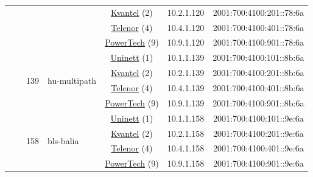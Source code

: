 \begin{small}
\begin{center}
\begin{longtable}{|c|c|c|c|c|c|c|c|}
  &  &  &  & \multicolumn{2}{|c|}{\tiny{\href{http://kvantel.no}{Kvantel} (2)}} & \tiny{10.2.1.120} & \tiny{2001:700:4100:201::78:6a} \\* \cline{5-5}\cline{6-6}\cline{7-7}\cline{8-8}
  &  &  &  & \multicolumn{2}{|c|}{\tiny{\href{https://www.telenor.no}{Telenor} (4)}} & \tiny{10.4.1.120} & \tiny{2001:700:4100:401::78:6a} \\* \cline{5-5}\cline{6-6}\cline{7-7}\cline{8-8}
  &  &  &  & \multicolumn{2}{|c|}{\tiny{\href{http://www.powertech.no}{PowerTech} (9)}} & \tiny{10.9.1.120} & \tiny{2001:700:4100:901::78:6a} \\* \cline{3-3}\cline{4-4}\cline{5-5}\cline{6-6}\cline{7-7}\cline{8-8}
  &  & \multirow{4}{*}{\tiny{139}} & \multicolumn{1}{|l|}{\multirow{4}{*}{\tiny{hu-multipath}}} & \multicolumn{2}{|c|}{\tiny{\href{https://www.uninett.no}{Uninett} (1)}} & \tiny{10.1.1.139} & \tiny{2001:700:4100:101::8b:6a} \\* \cline{5-5}\cline{6-6}\cline{7-7}\cline{8-8}
  &  &  &  & \multicolumn{2}{|c|}{\tiny{\href{http://kvantel.no}{Kvantel} (2)}} & \tiny{10.2.1.139} & \tiny{2001:700:4100:201::8b:6a} \\* \cline{5-5}\cline{6-6}\cline{7-7}\cline{8-8}
  &  &  &  & \multicolumn{2}{|c|}{\tiny{\href{https://www.telenor.no}{Telenor} (4)}} & \tiny{10.4.1.139} & \tiny{2001:700:4100:401::8b:6a} \\* \cline{5-5}\cline{6-6}\cline{7-7}\cline{8-8}
  &  &  &  & \multicolumn{2}{|c|}{\tiny{\href{http://www.powertech.no}{PowerTech} (9)}} & \tiny{10.9.1.139} & \tiny{2001:700:4100:901::8b:6a} \\* \cline{3-3}\cline{4-4}\cline{5-5}\cline{6-6}\cline{7-7}\cline{8-8}
  &  & \multirow{4}{*}{\tiny{158}} & \multicolumn{1}{|l|}{\multirow{4}{*}{\tiny{bls-balia}}} & \multicolumn{2}{|c|}{\tiny{\href{https://www.uninett.no}{Uninett} (1)}} & \tiny{10.1.1.158} & \tiny{2001:700:4100:101::9e:6a} \\* \cline{5-5}\cline{6-6}\cline{7-7}\cline{8-8}
  &  &  &  & \multicolumn{2}{|c|}{\tiny{\href{http://kvantel.no}{Kvantel} (2)}} & \tiny{10.2.1.158} & \tiny{2001:700:4100:201::9e:6a} \\* \cline{5-5}\cline{6-6}\cline{7-7}\cline{8-8}
  &  &  &  & \multicolumn{2}{|c|}{\tiny{\href{https://www.telenor.no}{Telenor} (4)}} & \tiny{10.4.1.158} & \tiny{2001:700:4100:401::9e:6a} \\* \cline{5-5}\cline{6-6}\cline{7-7}\cline{8-8}
  &  &  &  & \multicolumn{2}{|c|}{\tiny{\href{http://www.powertech.no}{PowerTech} (9)}} & \tiny{10.9.1.158} & \tiny{2001:700:4100:901::9e:6a} \\* \cline{3-3}\cline{4-4}\cline{5-5}\cline{6-6}\cline{7-7}\cline{8-8}

\end{longtable}
\end{center}
\end{small}

